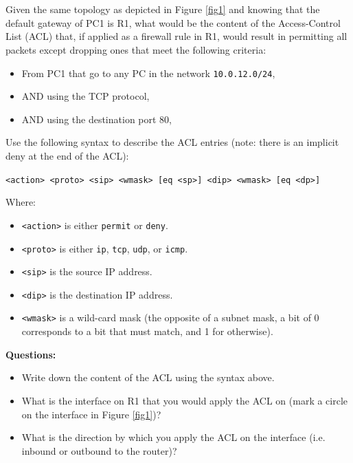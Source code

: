 \documentclass[pdftex,12pt,a4paper]{article}
\begin{document}
    \section{}
        Given the same topology as depicted in Figure \ref{fig1} and knowing
        that the default gateway of PC1 is R1, what would be the content of the
        Access-Control List (ACL) that, if applied as a firewall rule in R1,
        would result in permitting all packets except dropping ones that
        meet the following criteria:
        \begin{itemize}
            \item From PC1 that go to any PC in the network \texttt{10.0.12.0/24},
            \item AND using the TCP protocol,
            \item AND using the destination port 80,
        \end{itemize}

        Use the following syntax to describe the ACL entries (note: there is an
        implicit deny at the end of the ACL): 
        
        \texttt{<action> <proto> <sip> <wmask> [eq <sp>] <dip> <wmask> [eq
        <dp>]}
        \vspace{0.2cm}

        Where:
        \begin{itemize}
            \item \texttt{<action>} is either \texttt{permit} or \texttt{deny}.
            \item \texttt{<proto>} is either \texttt{ip}, \texttt{tcp}, \texttt{udp}, or \texttt{icmp}.
            \item \texttt{<sip>} is the source IP address.
            \item \texttt{<dip>} is the destination IP address.
            \item \texttt{<wmask>} is a wild-card mask (the opposite of a subnet
                mask, a bit of 0 corresponds to a bit that must match, and 1
                for otherwise).
        \end{itemize}

        \textbf{Questions:}
        \begin{itemize}
            \item Write down the content of the ACL using the syntax above.
            \item What is the interface on R1 that you would apply the ACL on
                (mark a circle on the interface in Figure \ref{fig1})?
            \item What is the direction by which you apply the ACL on the
                interface (i.e.  inbound or outbound to the router)?
        \end{itemize}
\end{document}
